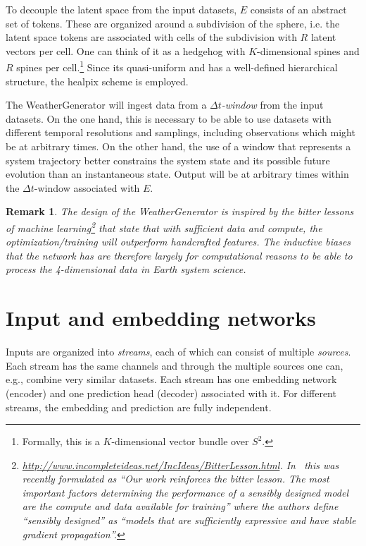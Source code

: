 \documentclass{article}
\newtheorem{remark}{Remark}
\begin{document}
To decouple the latent space from the input datasets, $E$ consists of an abstract set of tokens.
These are organized around a subdivision of the sphere, i.e. the latent space tokens are associated with cells of the subdivision with $R$ latent vectors per cell.
One can think of it as a hedgehog with $K$-dimensional spines and $R$ spines per cell.\footnote{Formally, this is a $K$-dimensional vector bundle over $S^2$.}
Since its quasi-uniform and has a well-defined hierarchical structure, the healpix scheme is employed.

The WeatherGenerator will ingest data from a \emph{$\Delta t$-window} from the input datasets. 
On the one hand, this is necessary to be able to use datasets with different temporal resolutions and samplings, including observations which might be at arbitrary times. 
On the other hand, the use of a window that represents a system trajectory better constrains the system state and its possible future evolution than an instantaneous state.
Output will be at arbitrary times within the $\Delta t$-window associated with $E$. 

\begin{remark}
The design of the WeatherGenerator is inspired by the \emph{bitter lessons of machine learning}\footnote{\url{http://www.incompleteideas.net/IncIdeas/BitterLesson.html}. In~\cite{Smith2023Convnets} this was recently formulated as ``Our work reinforces the bitter lesson. The most important factors determining the performance
of a sensibly designed model are the compute and data available for training'' where the authors define ``sensibly designed'' as ``models that are sufficiently expressive and have stable gradient propagation''.} that state that with sufficient data and compute, the optimization/training will outperform handcrafted features.
The inductive biases that the network has are therefore largely for computational reasons to be able to process the 4-dimensional data in Earth system science.
\end{remark}

\section{Input and embedding networks}

Inputs are organized into \emph{streams}, each of which can consist of multiple \emph{sources}. 
Each stream has the same channels and through the multiple sources one can, e.g., combine very similar datasets.
Each stream has one embedding network (encoder) and one prediction head (decoder) associated with it.
For different streams, the embedding and prediction are fully independent.
\end{document}
